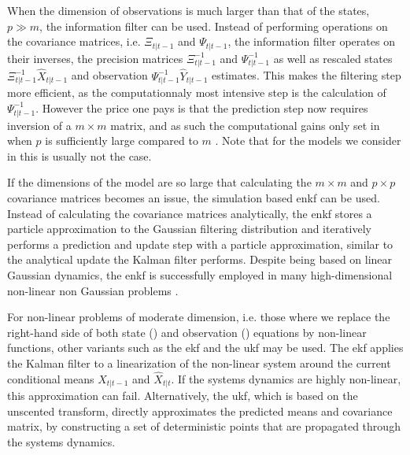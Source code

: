 When the dimension of observations is much larger than that of the states, $p \gg m$, the information filter \citep{Fraser1969Optimum} can be used. Instead of performing operations on the covariance matrices, i.e. $\Xi_{t|t-1}$ and $\Psi_{t|t-1}$, the information filter operates on their inverses, the precision matrices $\Xi_{t|t - 1}^{-1}$ and $\Psi_{t|t-1}^{-1}$ as well as rescaled states $\Xi_{t | t - 1}^{-1}
\hat X_{t | t - 1}$ and observation $\Psi_{t | t-1}^{-1}\hat Y_{t|t -1}$ estimates. This makes the filtering step more efficient, as the computationnaly most intensive step is the calculation of $\Psi_{t | t- 1}^{-1}$. However the price one pays is that the prediction step now requires inversion of a $m\times m$ matrix, and as such the computational gains only set in when $p$ is sufficiently large compared to $m$ \cite{Assimakis2012Information}. Note that for the models we consider in  this is usually not the case. 

If the dimensions of the model are so large that calculating the $m\times m$ and $p\times p$ covariance matrices becomes an issue, the simulation based \acrfull{enkf} \citep{Evensen1994Sequential} can be used. Instead of calculating the covariance matrices analytically, the \acrshort{enkf} stores a particle approximation to the Gaussian filtering distribution and iteratively performs a prediction and update step with a particle approximation, similar to the analytical update the Kalman filter performs. Despite being based on linear Gaussian dynamics, the \acrshort{enkf} is successfully employed in many high-dimensional non-linear non Gaussian problems \citep{Katzfuss2016Understanding}. 

For non-linear problems of moderate dimension, i.e. those where we replace the right-hand side of both state () and observation () equations by non-linear functions, other variants such as the \acrfull{ekf} \citep{Jazwinski1970Stochastic} and the \acrfull{ukf} \citep{Julier1997New} may be used. The \acrshort{ekf} applies the Kalman filter to a linearization of the non-linear system around the current conditional means $\hat X_{t| t-1}$ and $\hat X_{t|t}$. If the systems dynamics are highly non-linear, this approximation can fail. Alternatively, the \acrshort{ukf}, which is based on the unscented transform, directly approximates the predicted means and covariance matrix, by constructing a set of deterministic points that are propagated through the systems dynamics. 

